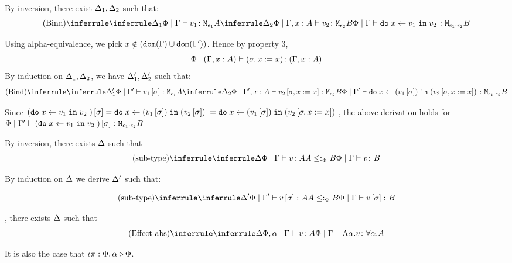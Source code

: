 {
    By inversion, there exist $\Delta_1, \Delta_2$ such that:
    \begin{equation}
        \ntreeruleII{Bind}{
            \treeruleI{\D_1}{\etyperelation{\P}{\G}{v_1}{\M{\e_1}{A}}}
            }{
            \treeruleI{\D_2}{\etyperelation{\P}{\G, x:A}{v_2}{\M{\e_2}{B}}}
        }{\etyperelation{\P}{\G}{\doin{x}{v_1}{v_2}}{\M{\e_1\dot\e_2}{B}}}
    \end{equation}

    Using alpha-equivalence, we pick $x\notin(\texttt{dom}(\Gamma)\cup\texttt{dom}(\Gamma'))$. Hence by property 3, $$\Phi\mid(\Gamma, x: A) \vdash (\sigma, x:= x) \colon (\Gamma, x: A)$$
    By induction on $\Delta_1, \Delta_2$, we have $\Delta_1', \Delta_2'$ such that:
    \begin{equation}
        \ntreeruleII{Bind}{
            \treeruleI{\D_1'}{\etyperelation{\P}{\G'}{v_1\ssi}{\M{\e_1}{A}}}
            }{
            \treeruleI{\D_2}{\etyperelation{\P}{\G', x:A}{v_2\sub{\si, x\setto x}}{\M{\e_2}{B}}}
        }{\etyperelation{\P}{\G'}{\doin{x}{(v_1\ssi)}{(v_2\sub{\si, x\setto x})}}{\M{\e_1\dot\e_2}{B}}}
    \end{equation}

    Since $(\texttt{do}\; x \leftarrow v_1 \;\texttt{in}\; v_2\;)\left[\sigma\right] = \texttt{do}\; x \leftarrow (v_1\left[\sigma\right]) \;\texttt{in}\; (v_2\left[\sigma\right])\; = \texttt{do}\; x \leftarrow (v_1\left[\sigma\right]) \;\texttt{in}\; (v_2\left[\sigma, x:= x\right])\;$, the above derivation holds for $\Phi\mid\Gamma' \vdash (\texttt{do}\; x \leftarrow v_1 \;\texttt{in}\; v_2\;)\left[\sigma\right] \colon \texttt{M}_{\epsilon_1\cdot\epsilon_2}{B}$

    By inversion, there exists $\Delta$ such that
    \begin{equation}
        \ntreeruleII{sub-type}{\treeruleI{\D}{\etyperelation{\P}{\G}{v}{A}}}{ A\subtypep B}{\etyperelation{\P}{\G}{v}{B}}
    \end{equation}

    By induction on $\Delta$ we derive $\Delta'$ such that:

    \begin{equation}
        \ntreeruleII{sub-type}{\treeruleI{\D'}{\etyperelation{\P}{\G'}{v\ssi}{A}}}{ A\subtypep B}{\etyperelation{\P}{\G}{v\ssi}{B}}
    \end{equation}

\bi, there exists $\Delta$ such that 
\begin{equation}
    \ntreeruleI{Effect-abs}{\treeruleI{\D}{\etyperelation{\P,\a}{\G}{v}{A}}}{\gpetyperelation{\elam{\a}{v}}{\all{\a}{A}}}
\end{equation}

It is also the case that $\iota\pi : \Phi,\alpha \triangleright \Phi$.

}
